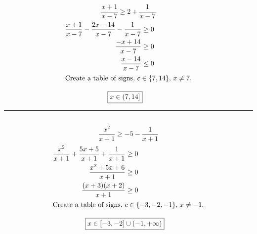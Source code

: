 	\subsection{}
		\[\frac{x + 1}{x - 7} \geq 2 + \frac{1}{x - 7}\]
		\begin{align*}
			\frac{x + 1}{x - 7} - \frac{2x - 14}{x - 7} - \frac{1}{x - 7} &\geq 0 \\
			\frac{-x + 14}{x - 7} &\geq 0 \\
			\frac{x - 14}{x - 7} &\leq 0 \\
			\intertext{Create a table of signs, $c \in \{7, 14\}$, $x \neq 7$.}
		\end{align*}
		\begin{center}\end{center}
		\begin{align*}
			\Aboxed{x &\in (7, 14]}
		\end{align*}
		\hrule{}

	\subsection{}
		\[\frac{x^2}{x + 1} \geq -5 - \frac{1}{x + 1}\]
		\begin{align*}
			\frac{x^2}{x + 1} + \frac{5x + 5}{x + 1} + \frac{1}{x + 1} &\geq 0 \\
			\frac{x^2 + 5x + 6}{x + 1} &\geq 0 \\
			\frac{(x + 3)(x + 2)}{x + 1} &\geq 0 \\
			\intertext{Create a table of signs, $c \in \{-3, -2, -1\}$, $x \neq -1$.}
		\end{align*}
		\begin{center}\end{center}
		\begin{align*}
			\Aboxed{x &\in [-3, -2] \cup (-1, +\infty)}
		\end{align*}
		\pagebreak{}

